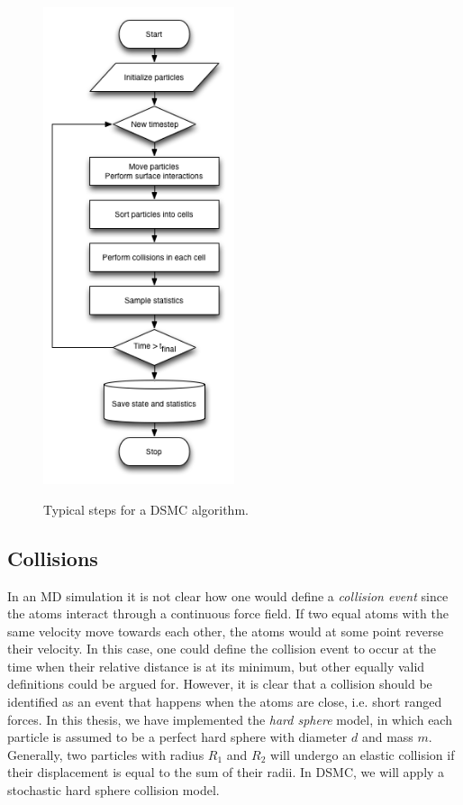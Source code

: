 \begin{figure}[h]
\begin{center}
\includegraphics[width=0.5\textwidth, trim=0cm 0cm 0cm 0cm, clip]{DSMC/figures/dsmc_flowchart.png}
\label{fig:dsmc_flowchart}
\end{center}
\caption{Typical steps for a DSMC algorithm.}
\end{figure}

\subsection{Collisions}
In an MD simulation it is not clear how one would define a \textit{collision event} since the atoms interact through a continuous force field. If two equal atoms with the same velocity move towards each other, the atoms would at some point reverse their velocity. In this case, one could define the collision event to occur at the time when their relative distance is at its minimum, but other equally valid definitions could be argued for. However, it is clear that a collision should be identified as an event that happens when the atoms are close, i.e. short ranged forces. In this thesis, we have implemented the \textit{hard sphere} model, in which each particle is assumed to be a perfect hard sphere with diameter $d$ and mass $m$. Generally, two particles with radius $R_1$ and $R_2$ will undergo an elastic collision if their displacement is equal to the sum of their radii. In DSMC, we will apply a stochastic hard sphere collision model.\\
